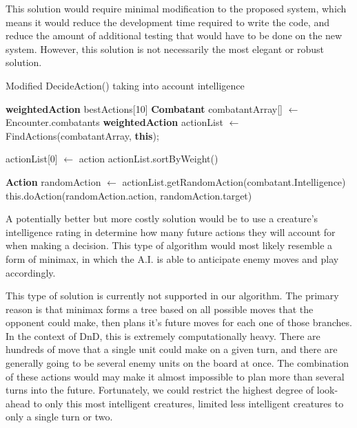 \documentclass[12pt,a4paper]{report}
\begin{document}
		This solution would require minimal modification to the proposed system, which means it would reduce the development time required to write the code, and reduce the amount of additional testing that would have to be done on the new system. However, this solution is not necessarily the most elegant or robust solution. 
		
		\begin{algorithm}
			\caption{Modified DecideAction() taking into account intelligence}
			\label{table:Decide Action}
			\begin{algorithmic}[1]
					\State \textbf{weightedAction} bestActions[10]
					\State \textbf{Combatant} combatantArray[] $\gets$ Encounter.combatants
					\State \textbf{weightedAction} actionList $\gets$ FindActions(combatantArray, \textbf{this});
					\State
					
							\State actionList[0] $\gets$ action
							\State actionList.sortByWeight()
						\EndIf
					\EndFor
					
					
					\State
					\State \textbf{Action} randomAction $\gets$ actionList.getRandomAction(combatant.Intelligence)
					\State this.doAction(randomAction.action, randomAction.target)
				\EndFunction
			\end{algorithmic}
		\end{algorithm}
		
		
		A potentially better but more costly solution would be to use a creature's intelligence rating in determine how many future actions they will account for when making a decision. This type of algorithm would most likely resemble a form of minimax, in which the A.I. is able to anticipate enemy moves and play accordingly. 
		
		This type of solution is currently not supported in our algorithm. The primary reason is that minimax forms a tree based on all possible moves that the opponent could make, then plans it's future moves for each one of those branches. In the context of DnD, this is extremely computationally heavy. There are hundreds of move that a single unit could make on a given turn, and there are generally going to be several enemy units on the board at once. The combination of these actions would may make it almost impossible to plan more than several turns into the future. Fortunately, we could restrict the highest degree of look-ahead to only this most intelligent creatures, limited less intelligent creatures to only a single turn or two. 
		
\end{document}

